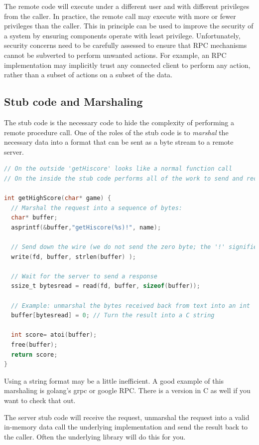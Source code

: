 The remote code will execute under a different user and with different privileges from the caller.
In practice, the remote call may execute with more or fewer privileges than the caller.
This in principle can be used to improve the security of a system by ensuring components operate with least privilege.
Unfortunately, security concerns need to be carefully assessed to ensure that RPC mechanisms cannot be subverted to perform unwanted actions.
For example, an RPC implementation may implicitly trust any connected client to perform any action, rather than a subset of actions on a subset of the data.

\subsection{Stub code and Marshaling}

The stub code is the necessary code to hide the complexity of performing a remote procedure call.
One of the roles of the stub code is to \emph{marshal} the necessary data into a format that can be sent as a byte stream to a remote server.

\begin{lstlisting}[language=C]
// On the outside 'getHiscore' looks like a normal function call
// On the inside the stub code performs all of the work to send and receive data to and from the remote machine.

int getHighScore(char* game) {
  // Marshal the request into a sequence of bytes:
  char* buffer;
  asprintf(&buffer,"getHiscore(%s)!", name);

  // Send down the wire (we do not send the zero byte; the '!' signifies the end of the message)
  write(fd, buffer, strlen(buffer) );

  // Wait for the server to send a response
  ssize_t bytesread = read(fd, buffer, sizeof(buffer));

  // Example: unmarshal the bytes received back from text into an int
  buffer[bytesread] = 0; // Turn the result into a C string

  int score= atoi(buffer);
  free(buffer);
  return score;
}
\end{lstlisting}

Using a string format may be a little inefficient.
A good example of this marshaling is golang's grpc or google RPC. There is a version in C as well if you want to check that out.

The server stub code will receive the request, unmarshal the request into a valid in-memory data call the underlying implementation and send the result back to the caller.
Often the underlying library will do this for you.

